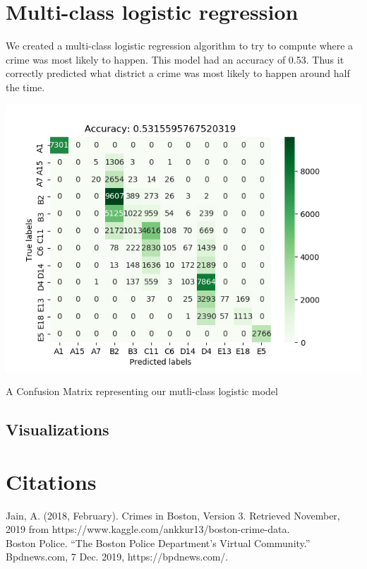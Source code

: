 \documentclass[a0,landscape]{a0poster}
\let\Section=\section
\def\section{\setcounter{equation}{0}\Section}
\newcommand{\1}{\bold{1}}
\begin{document}
\begin{multicols}{3}
\section{Multi-class logistic regression}
We created a multi-class logistic regression algorithm to try to compute where a crime was most likely to happen. This model had an accuracy of 0.53. Thus it correctly predicted what district a crime was most likely to happen around half the time. 
 \begin{center}
    \includegraphics{ConfustionMatrix.png}
  
       A Confusion Matrix representing our mutli-class logistic model
   \end{center}


  

\subsection{Visualizations}






\section*{Citations}

Jain, A. (2018, February). Crimes in Boston, Version 3. Retrieved November, 2019 from https://www.kaggle.com/ankkur13/boston-crime-data.\\
Boston Police. “The Boston Police Department's Virtual Community.” Bpdnews.com, 7 Dec. 2019, https://bpdnews.com/.





\end{multicols}
\end{document}
